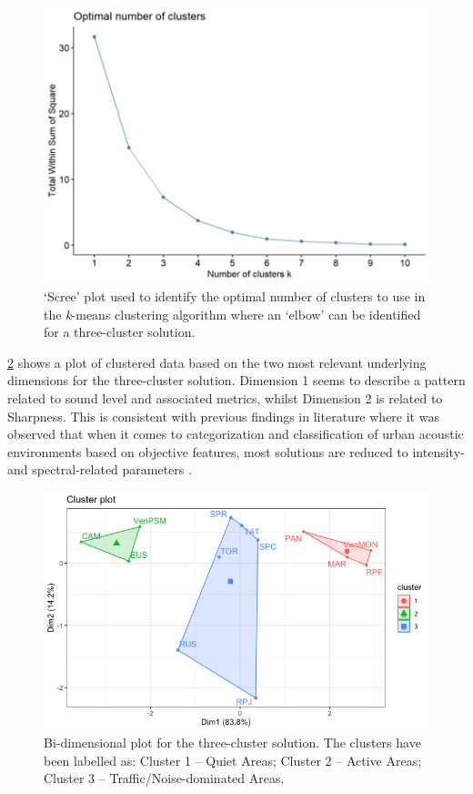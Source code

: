 \begin{figure}[h!]
  \centering
  \includegraphics[width=.75\textwidth]{Figures/NoiseMappingLockdown Fig 6.png}
  \caption{`Scree' plot used to identify the optimal number of clusters to use in the \emph{k}-means clustering algorithm where an `elbow' can be identified for a three-cluster solution. \label{fig:NsMapLockScree}}
\end{figure}

\cref{fig:NsMapLockBiplot} shows a plot of clustered data based on the two most relevant underlying dimensions for the three-cluster solution. Dimension 1 seems to describe a pattern related to sound level and associated metrics, whilst Dimension 2 is related to Sharpness. This is consistent with previous findings in literature where it was observed that when it comes to categorization and classification of urban acoustic environments based on objective features, most solutions are reduced to intensity- and spectral-related parameters \citep{deCoensel2006quiet,Aletta2017Dimensions}.

\begin{figure}[h!]
  \centering
  \includegraphics[width=\textwidth]{Figures/LockdownClusterAnalysis1_2022-04-29.png}
  \caption{Bi-dimensional plot for the three-cluster solution. The clusters have been labelled as: Cluster 1 -- Quiet Areas; Cluster 2 -- Active Areas; Cluster 3 -- Traffic/Noise-dominated Areas. \label{fig:NsMapLockBiplot}}
\end{figure}

